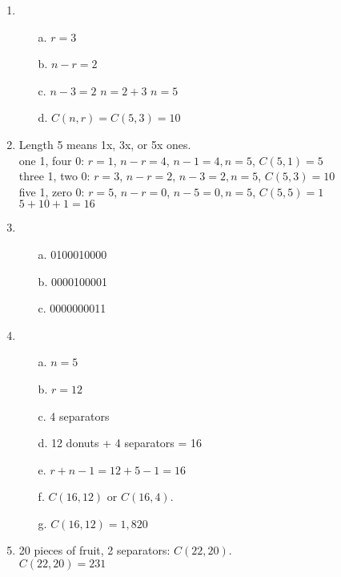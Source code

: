
\newcommand{\laClass}       {CS 211}
\newcommand{\laSemester}    {Spring 2018}
\newcommand{\laChapter}     {5.4}
\newcommand{\laType}        {Exercise}
\newcommand{\laPoints}      {5}
\newcommand{\laTitle}       {Binary Sequences}
\newcommand{\laDate}        {Jan 25, 2018}
\setcounter{chapter}{5}
\setcounter{section}{4}
\addtocounter{section}{-1}

\toggletrue{answerkey}





    \begin{enumerate}
        \item
            \begin{itemize}
                \item[a.]	$r = 3$
                \item[b.]	$n-r = 2$
                \item[c.]	$n-3 = 2$ \tab $n = 2 + 3$ \tab $n = 5$
                \item[d.]	$C(n,r) = C(5,3) = 10$
            \end{itemize}
            
                    
        
        \item	Length 5 means 1x, 3x, or 5x ones.
					\\ one 1, four 0:	$r = 1$, $n-r = 4$, $n-1=4, n=5$, $C(5,1) = 5$
					\\ three 1, two 0:	$r = 3$, $n-r = 2$, $n-3=2, n=5$, $C(5,3) = 10$
					\\ five 1, zero 0:	$r = 5$, $n-r = 0$, $n-5=0, n=5$, $C(5,5) = 1$
					\\ $5 + 10 + 1 = 16$
		
        \item
            \begin{itemize}
                \item[a.]  0100010000
                \item[b.]  0000100001
                \item[c.]  0000000011
            \end{itemize}
            
        \item
            \begin{itemize}
                \item[a.]  $n = 5$
                \item[b.]  $r = 12$
                \item[c.]  4 separators
                \item[d.]  12 donuts + 4 separators = 16
                \item[e.]  $r + n - 1 = 12 + 5 - 1 = 16$
                \item[f.]  $C(16,12)$ or $C(16,4)$.
                \item[g.]  $C(16,12) = 1,820$
            \end{itemize}


        \item  20 pieces of fruit, 2 separators: $C(22,20)$. \\
                    $C(22,20) = 231$
    \end{enumerate}


